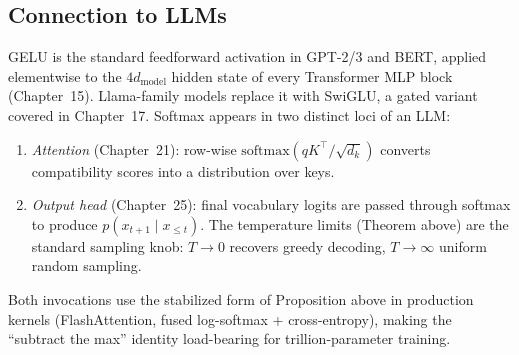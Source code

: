 \subsection*{Connection to LLMs}

GELU is the standard feedforward activation in GPT-2/3 and BERT, applied elementwise to the $4d_{\text{model}}$ hidden state of every Transformer MLP block (Chapter~15). Llama-family models replace it with SwiGLU, a gated variant covered in Chapter~17. Softmax appears in two distinct loci of an LLM:

\begin{enumerate}
\item \emph{Attention} (Chapter~21): row-wise $\mathrm{softmax}(qK^\top/\sqrt{d_k})$ converts compatibility scores into a distribution over keys.
\item \emph{Output head} (Chapter~25): final vocabulary logits are passed through softmax to produce $p(x_{t+1}\mid x_{\le t})$. The temperature limits (Theorem above) are the standard sampling knob: $T\to 0$ recovers greedy decoding, $T\to\infty$ uniform random sampling.
\end{enumerate}

Both invocations use the stabilized form of Proposition above in production kernels (FlashAttention, fused log-softmax + cross-entropy), making the ``subtract the max'' identity load-bearing for trillion-parameter training.
